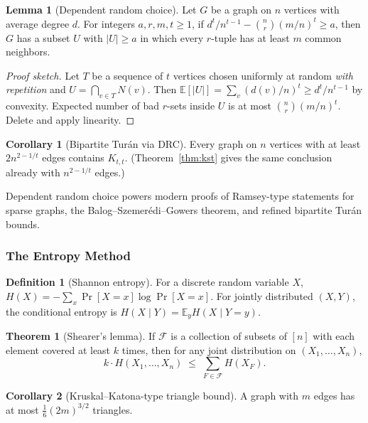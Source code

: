 \documentclass{article}
\theoremstyle{definition}
\newtheorem{theorem}{Theorem}
\newtheorem{lemma}{Lemma}
\newtheorem{corollary}{Corollary}
\newtheorem{definition}{Definition}
\begin{document}
\begin{lemma}[Dependent random choice]\label{lem:drc}
Let $G$ be a graph on $n$ vertices with average degree $d$. For
integers $a, r, m, t \ge 1$, if
$d^t/n^{t - 1} - \binom{n}{r}(m/n)^t \ge a$,
then $G$ has a subset $U$ with $|U| \ge a$ in which every $r$-tuple
has at least $m$ common neighbors.
\end{lemma}

\begin{proof}[Proof sketch]
Let $T$ be a sequence of $t$ vertices chosen uniformly at random
\emph{with repetition} and $U = \bigcap_{v \in T} N(v)$. Then
$\mathbb{E}[|U|] = \sum_{v} (d(v)/n)^t \ge d^t/n^{t - 1}$ by convexity.
Expected number of bad $r$-sets
inside $U$ is at most $\binom{n}{r}(m/n)^t$. Delete and apply
linearity.
\end{proof}

\begin{corollary}[Bipartite Tur\'an via DRC]
Every graph on $n$ vertices with at least $2n^{2 - 1/t}$ edges contains
$K_{t, t}$. (Theorem~\ref{thm:kst} gives the same conclusion already with
$n^{2 - 1/t}$ edges.)
\end{corollary}

Dependent random choice powers modern proofs of Ramsey-type
statements for sparse graphs, the Balog--Szemer\'edi--Gowers theorem,
and refined bipartite Tur\'an bounds.

\subsubsection{The Entropy Method}

\begin{definition}[Shannon entropy]
For a discrete random variable $X$,
$H(X) = -\sum_x \Pr[X = x] \log \Pr[X = x]$. For jointly distributed
$(X, Y)$, the conditional entropy is
$H(X \mid Y) = \mathbb E_y H(X \mid Y = y)$.
\end{definition}

\begin{theorem}[Shearer's lemma]
If $\mathcal F$ is a collection of subsets of $[n]$ with each element
covered at least $k$ times, then for any joint distribution on
$(X_1, \dots, X_n)$,
\[
  k \cdot H(X_1, \dots, X_n) \;\le\; \sum_{F \in \mathcal F} H(X_F).
\]
\end{theorem}

\begin{corollary}[Kruskal--Katona-type triangle bound]
A graph with $m$ edges has at most $\tfrac{1}{6}(2m)^{3/2}$ triangles.
\end{corollary}
\end{document}
